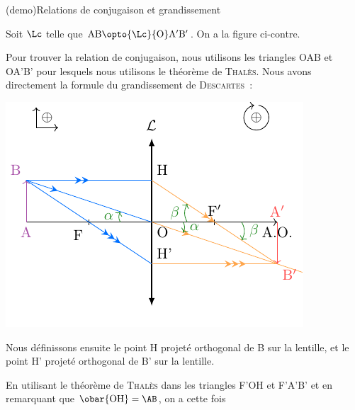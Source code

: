 \documentclass[../../main/main.tex]{subfiles}
\begin{document}
\begin{tcb*}[label=demo:lent_rc,
		list entry={\lte Rela$^\circ$ de conjug.\ et $\gamma$ des lentilles},
		breakable](demo){Relations de conjugaison et grandissement}
	\begin{isd}
		Soit $\Lc$ telle que $\rm AB \opto{\Lc}{\rm O} A'B'$. On a la figure
		ci-contre.

		Pour trouver la relation de conjugaison, nous utilisons les triangles
		OAB et OA'B' pour lesquels nous utilisons le théorème de \textsc{Thalès}.
		Nous avons directement la formule du grandissement de \textsc{Descartes}~:
		\psw{%
			\[
				\boxed{
					\frac{\ABp}{\AB} =
					\frac{\OAp}{\OA} = \gamma
				}%
			\]
		}%
		\tcblower
		\begin{center}
			\includegraphics[width=\linewidth]{lent_conv-demo}
			\label{fig:lent_rc}
		\end{center}
	\end{isd}
	Nous définissons ensuite le point H projeté orthogonal de B sur
	la lentille, et le point H' projeté orthogonal de B' sur la lentille.
	\smallbreak
	\begin{isd}
		En utilisant le théorème de \textsc{Thalès} dans les triangles F'OH et
		F'A'B' et en remarquant que $\obar{\rm OH} = \AB$, on a cette fois
\end{isd}
\end{tcb*}
\end{document}
